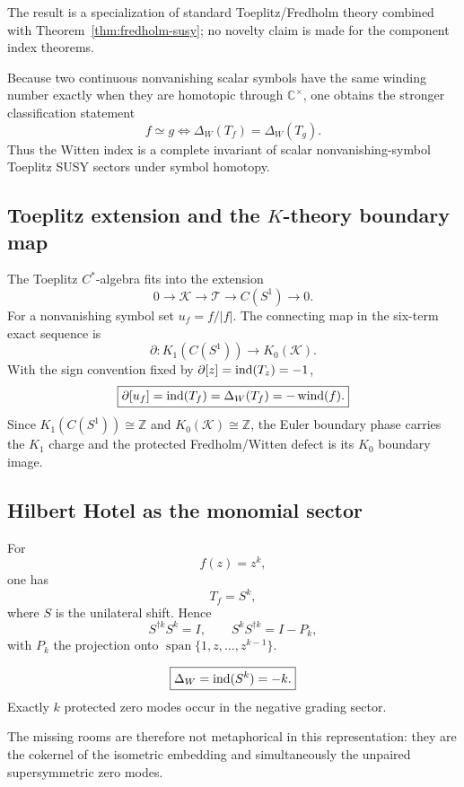 The result is a specialization of standard Toeplitz/Fredholm theory combined with Theorem~\ref{thm:fredholm-susy}; no novelty claim is made for the component index theorems.

Because two continuous nonvanishing scalar symbols have the same winding number exactly when they are homotopic through $\mathbb C^\times$, one obtains the stronger classification statement
\[
\boxed{
f\simeq g
\iff
\Delta_W(T_f)=\Delta_W(T_g).
}
\]
Thus the Witten index is a complete invariant of scalar nonvanishing-symbol Toeplitz SUSY sectors under symbol homotopy.

\subsection{Toeplitz extension and the $K$-theory boundary map}

The Toeplitz $C^*$-algebra fits into the extension
\[
0\longrightarrow\mathcal K
\longrightarrow\mathcal T
\longrightarrow C(S^1)
\longrightarrow0.
\]
For a nonvanishing symbol set $u_f=f/|f|$. The connecting map in the six-term exact sequence is
\[
\partial:
K_1(C(S^1))
\longrightarrow
K_0(\mathcal K).
\]
With the sign convention fixed by $\partial[z]=\operatorname{ind}(T_z)=-1$,
\[
\boxed{
\partial[u_f]
=
\operatorname{ind}(T_f)
=
\Delta_W(T_f)
=
-\operatorname{wind}(f).
}
\]
Since $K_1(C(S^1))\cong\mathbb Z$ and $K_0(\mathcal K)\cong\mathbb Z$, the Euler boundary phase carries the $K_1$ charge and the protected Fredholm/Witten defect is its $K_0$ boundary image.

\subsection{Hilbert Hotel as the monomial sector}

For
\[
f(z)=z^k,
\]
one has
\[
T_f=S^k,
\]
where $S$ is the unilateral shift. Hence
\[
S^{\dagger k}S^k=I,
\qquad
S^kS^{\dagger k}=I-P_k,
\]
with $P_k$ the projection onto $\operatorname{span}\{1,z,\ldots,z^{k-1}\}$.

\begin{corollary}\label{cor:hotel}
\[
\boxed{
\Delta_W
=
\operatorname{ind}(S^k)
=
-k.
}
\]
Exactly $k$ protected zero modes occur in the negative grading sector.
\end{corollary}

The missing rooms are therefore not metaphorical in this representation: they are the cokernel of the isometric embedding and simultaneously the unpaired supersymmetric zero modes.


